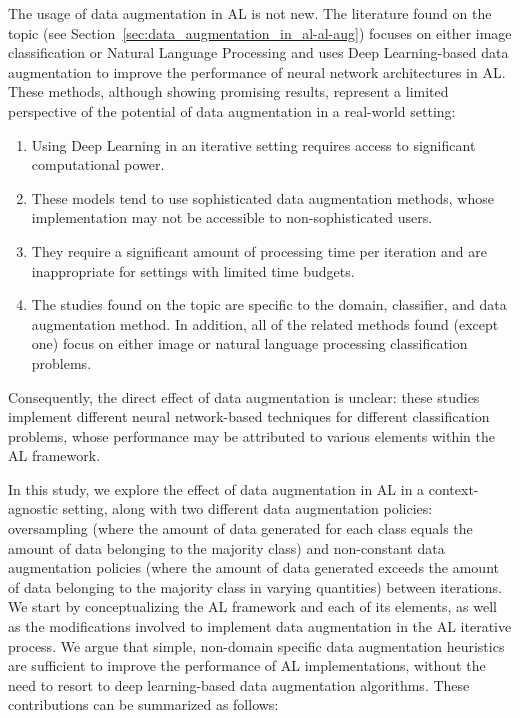 The usage of data augmentation in AL is not new. The literature found on the
topic (see Section~\ref{sec:data_augmentation_in_al-al-aug}) focuses on either image
classification or Natural Language Processing and uses Deep Learning-based
data augmentation to improve the performance of neural network architectures
in AL\@. These methods, although showing promising results, represent a
limited perspective of the potential of data augmentation in a real-world
setting: 

\begin{enumerate}

    \item Using Deep Learning in an iterative setting requires access to
        significant computational power.

    \item These models tend to use sophisticated data augmentation methods,
        whose implementation may not be accessible to non-sophisticated users.

    \item They require a significant amount of processing time per
        iteration and are inappropriate for settings with limited time
        budgets.

    \item The studies found on the topic are specific to the domain,
        classifier, and data augmentation method.
        In addition, all of the related methods found (except one) focus
        on either image or natural language processing classification
        problems.

\end{enumerate}

Consequently, the direct effect of data augmentation is unclear: these studies
implement different neural network-based techniques for different
classification problems, whose performance may be attributed to various
elements within the AL framework.

In this study, we explore the effect of data augmentation in AL in a
context-agnostic setting, along with two different data augmentation policies:
oversampling (where the amount of data generated for each class equals the
amount of data belonging to the majority class) and non-constant data
augmentation policies (where the amount of data generated exceeds the amount
of data belonging to the majority class in varying quantities) between
iterations. We start by conceptualizing the AL framework and each of its
elements, as well as the modifications involved to implement data augmentation
in the AL iterative process. We argue that simple, non-domain specific data
augmentation heuristics are sufficient to improve the performance of AL
implementations, without the need to resort to deep learning-based data
augmentation algorithms. These contributions can be summarized as
follows:

